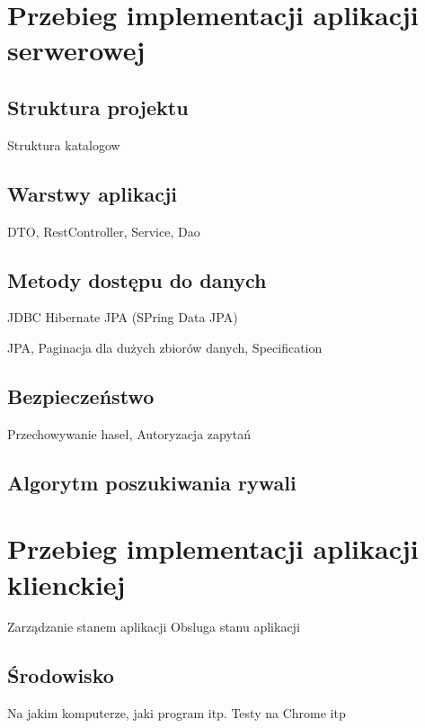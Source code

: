\section{Przebieg implementacji aplikacji serwerowej}

\subsection{Struktura projektu}

Struktura katalogow 

\subsection{Warstwy aplikacji}

DTO, RestController, Service, Dao

\subsection{Metody dostępu do danych}

JDBC Hibernate JPA (SPring Data JPA)

JPA, Paginacja dla dużych zbiorów danych, Specification

\subsection{Bezpieczeństwo}

Przechowywanie haseł, Autoryzacja zapytań

\subsection{Algorytm poszukiwania rywali}

\section{Przebieg implementacji aplikacji klienckiej}

Zarządzanie stanem aplikacji Obsluga stanu aplikacji

\subsection{Środowisko}

Na jakim komputerze, jaki program itp. Testy na Chrome itp
